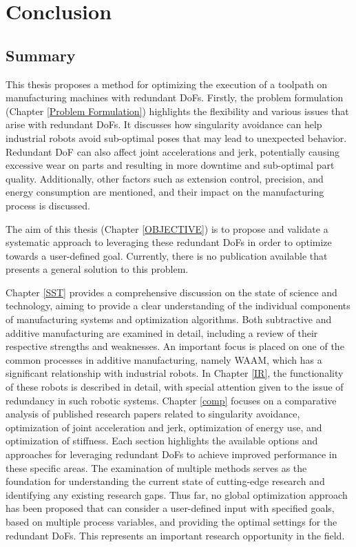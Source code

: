 \chapter{Conclusion}%
\section{Summary}%
This thesis proposes a method for optimizing the execution of a toolpath on manufacturing machines with redundant \acrshort{DoF}s. Firstly, the problem formulation (Chapter \ref{Problem Formulation}) highlights the flexibility and various issues that arise with redundant \acrshort{DoF}s. It discusses how singularity avoidance can help industrial robots avoid sub-optimal poses that may lead to unexpected behavior. Redundant \acrshort{DoF} can also affect joint accelerations and jerk, potentially causing excessive wear on parts and resulting in more downtime and sub-optimal part quality. Additionally, other factors such as extension control, precision, and energy consumption are mentioned, and their impact on the manufacturing process is discussed.

The aim of this thesis (Chapter \ref{OBJECTIVE}) is to propose and validate a systematic approach to leveraging these redundant \acrshort{DoF}s in order to optimize towards a user-defined goal. Currently, there is no publication available that presents a general solution to this problem.


Chapter \ref{SST} provides a comprehensive discussion on the state of science and technology, aiming to provide a clear understanding of the individual components of manufacturing systems and optimization algorithms. Both subtractive and additive manufacturing are examined in detail, including a review of their respective strengths and weaknesses. An important focus is placed on one of the common processes in additive manufacturing, namely \acrshort{WAAM}, which has a significant relationship with industrial robots. In Chapter \ref{IR}, the functionality of these robots is described in detail, with special attention given to the issue of redundancy in such robotic systems. Chapter \ref{comp} focuses on a comparative analysis of published research papers related to singularity avoidance, optimization of joint acceleration and jerk, optimization of energy use, and optimization of stiffness. Each section highlights the available options and approaches for leveraging redundant \acrshort{DoF}s to achieve improved performance in these specific areas. The examination of multiple methods serves as the foundation for understanding the current state of cutting-edge research and identifying any existing research gaps.
Thus far, no global optimization approach has been proposed that can consider a user-defined input with specified goals, based on multiple process variables, and providing the optimal settings for the redundant \acrshort{DoF}s. This represents an important research opportunity in the field.

